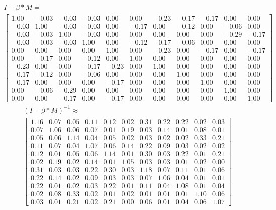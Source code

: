 \begin{gather}
	\nonumber I - \beta * M = \\
	\begin{bmatrix}
		 1.00 & -0.03 & -0.03 & -0.03 & 0.00 & 0.00 & -0.23 & -0.17 & -0.17 & 0.00 & 0.00\\
		 -0.03 & 1.00 & -0.03 & -0.03 & 0.00 & -0.17 & 0.00 & -0.12 & 0.00 & -0.06 & 0.00\\
		 -0.03 & -0.03 & 1.00 & -0.03 & 0.00 & 0.00 & 0.00 & 0.00 & 0.00 & -0.29 & -0.17\\
		 -0.03 & -0.03 & -0.03 & 1.00 & 0.00 & -0.12 & -0.17 & -0.06 & 0.00 & 0.00 & 0.00\\
		 0.00 & 0.00 & 0.00 & 0.00 & 1.00 & 0.00 & -0.23 & 0.00 & -0.17 & 0.00 & -0.17\\
		 0.00 & -0.17 & 0.00 & -0.12 & 0.00 & 1.00 & 0.00 & 0.00 & 0.00 & 0.00 & 0.00\\
		 -0.23 & 0.00 & 0.00 & -0.17 & -0.23 & 0.00 & 1.00 & 0.00 & 0.00 & 0.00 & 0.00\\
		 -0.17 & -0.12 & 0.00 & -0.06 & 0.00 & 0.00 & 0.00 & 1.00 & 0.00 & 0.00 & 0.00\\
		 -0.17 & 0.00 & 0.00 & 0.00 & -0.17 & 0.00 & 0.00 & 0.00 & 1.00 & 0.00 & 0.00\\
		 0.00 & -0.06 & -0.29 & 0.00 & 0.00 & 0.00 & 0.00 & 0.00 & 0.00 & 1.00 & 0.00\\
		 0.00 & 0.00 & -0.17 & 0.00 & -0.17 & 0.00 & 0.00 & 0.00 & 0.00 & 0.00 & 1.00
	\end{bmatrix}
	\label{frml:katzZentralitaetPseudoMitarbeiter:formel3}
\end{gather}
\begin{gather}
	\nonumber (I - \beta * M)^{-1} \approx\\
	\begin{bmatrix}
		1.16 & 0.07 & 0.05 & 0.11 & 0.12 & 0.02 & 0.31 & 0.22 & 0.22 & 0.02 & 0.03\\
		0.07 & 1.06 & 0.06 & 0.07 & 0.01 & 0.19 & 0.03 & 0.14 & 0.01 & 0.08 & 0.01\\
		0.05 & 0.06 & 1.14 & 0.04 & 0.05 & 0.02 & 0.03 & 0.02 & 0.02 & 0.33 & 0.21\\
		0.11 & 0.07 & 0.04 & 1.07 & 0.06 & 0.14 & 0.22 & 0.09 & 0.03 & 0.02 & 0.02\\
		0.12 & 0.01 & 0.05 & 0.06 & 1.14 & 0.01 & 0.30 & 0.03 & 0.22 & 0.01 & 0.21\\
		0.02 & 0.19 & 0.02 & 0.14 & 0.01 & 1.05 & 0.03 & 0.03 & 0.01 & 0.02 & 0.00\\
		0.31 & 0.03 & 0.03 & 0.22 & 0.30 & 0.03 & 1.18 & 0.07 & 0.11 & 0.01 & 0.06\\
		0.22 & 0.14 & 0.02 & 0.09 & 0.03 & 0.03 & 0.07 & 1.06 & 0.04 & 0.01 & 0.01\\
		0.22 & 0.01 & 0.02 & 0.03 & 0.22 & 0.01 & 0.11 & 0.04 & 1.08 & 0.01 & 0.04\\
		0.02 & 0.08 & 0.33 & 0.02 & 0.01 & 0.02 & 0.01 & 0.01 & 0.01 & 1.10 & 0.06\\
		0.03 & 0.01 & 0.21 & 0.02 & 0.21 & 0.00 & 0.06 & 0.01 & 0.04 & 0.06 & 1.07
	\end{bmatrix}
	\label{frml:katzZentralitaetPseudoMitarbeiter:formel4}
\end{gather}
